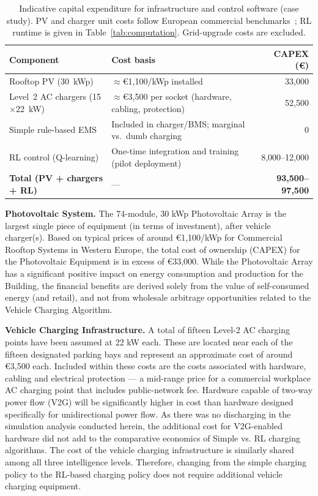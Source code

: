 \begin{table}[H]
\centering
\small
\caption{Indicative capital expenditure for infrastructure and control software (case study). PV and charger unit costs follow European commercial benchmarks~\cite{irena_rpgc_2023,doe_afdc_workplace,nrel_ev_pv_2019}; RL runtime is given in Table~\ref{tab:computation}. Grid-upgrade costs are excluded.}
\label{tab:capex_components}
\begin{tabular}{@{}p{}p{}r@{}}
\toprule
\textbf{Component} & \textbf{Cost basis} & \textbf{CAPEX (€)} \\
\midrule
Rooftop PV (30~kWp) & $\approx$€1{,}100/kWp installed & 33{,}000 \\
Level~2 AC chargers (15$\times$22~kW) & $\approx$€3{,}500 per socket (hardware, cabling, protection) & 52{,}500 \\
Simple rule-based EMS & Included in charger/BMS; marginal vs.\ dumb charging & 0 \\
RL control (Q-learning) & One-time integration and training (pilot deployment) & 8{,}000--12{,}000 \\
\midrule
\textbf{Total (PV + chargers + RL)} & --- & \textbf{93{,}500--97{,}500} \\
\bottomrule
\end{tabular}
\end{table}

\textbf{Photovoltaic System.} The 74-module, 30 kWp Photovoltaic Array is the largest single piece of equipment (in terms of investment), after vehicle charger(s). Based on typical prices of around €1,100/kWp for Commercial Rooftop Systems in Western Europe, the total cost of ownership (CAPEX) for the Photovoltaic Equipment is in excess of €33,000. While the Photovoltaic Array has a significant positive impact on energy consumption and production for the Building, the financial benefits are derived solely from the value of self-consumed energy (and retail), and not from wholesale arbitrage opportunities related to the Vehicle Charging Algorithm.

\textbf{Vehicle Charging Infrastructure.} A total of fifteen Level-2 AC charging points have been assumed at 22 kW each. These are located near each of the fifteen designated parking bays and represent an approximate cost of around €3,500 each. Included within these costs are the costs associated with hardware, cabling and electrical protection --- a mid-range price for a commercial workplace AC charging point that includes public-network fee. Hardware capable of two-way power flow (V2G) will be significantly higher in cost than hardware designed specifically for unidirectional power flow. As there was no discharging in the simulation analysis conducted herein, the additional cost for V2G-enabled hardware did not add to the comparative economics of Simple vs. RL charging algorithms. The cost of the vehicle charging infrastructure is similarly shared among all three intelligence levels. Therefore, changing from the simple charging policy to the RL-based charging policy does not require additional vehicle charging equipment.

